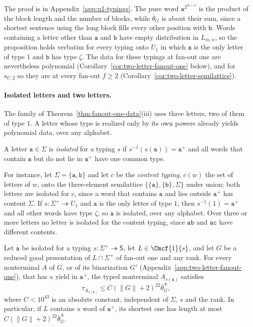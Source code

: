 The proof is in Appendix~\ref{app:u1-typings}.  The pure word
$\mathtt a^{2^{m+n}}$ is the product of the block length and the number of
blocks, while $\bar\theta_G$ is about their sum, since a shortest sentence using
the long block fills every other position with $\mathtt b$.  Words containing a
letter other than $\mathtt a$ and $\mathtt b$ have empty distribution in
$L_{m,n}$, so the proposition holds verbatim for every typing onto $U_1$ in
which $\mathtt a$ is the only letter of type $1$ and $\mathtt b$ has type $\zeta$.
The data for these typings at fan-out one are nevertheless polynomial
(Corollary~\ref{cor:two-letter-fanout-one} below), and for $s_{U,2}$ so they are
at every fan-out $f\ge2$ (Corollary~\ref{cor:two-letter-semilattice}).

\paragraph{Isolated letters and two letters.}
The family of Theorem~\ref{thm:fanout-one-data}(iii) uses three letters, two of
them of type $1$.  A letter whose type is realized only by its own powers
already yields polynomial data, over any alphabet.

\begin{definition}
\label{def:isolated-letter}
A letter $\mathtt a\in\Sigma$ is \emph{isolated} for a typing $s$ if
$s^{-1}(s(\mathtt a))=\mathtt a^+$ and all words that contain $\mathtt a$ but do
not lie in $\mathtt a^+$ have one common type.
\end{definition}

For instance, let $\Sigma=\{\mathtt a,\mathtt b\}$ and let $c$ be the
\emph{content typing}, $c(w)$ the set of letters of $w$, onto the
three-element semilattice $\{\{\mathtt a\},\{\mathtt b\},\Sigma\}$ under union;
both letters are isolated for $c$, since a word that contains $\mathtt a$ and
lies outside $\mathtt a^+$ has content $\Sigma$.  If $s:\Sigma^+\twoheadrightarrow
U_1$ and $\mathtt a$ is the only letter of type $1$, then $s^{-1}(1)=\mathtt a^+$
and all other words have type $\zeta$, so $\mathtt a$ is isolated, over any
alphabet.  Over three or more letters no letter is isolated for the content
typing, since $\mathtt{ab}$ and $\mathtt{ac}$ have different contents.

\begin{theorem}
\label{thm:two-letter-fanout-one}
Let $\mathtt a$ be isolated for a typing $s:\Sigma^+\twoheadrightarrow\mathsf S$,
let $L\in\Cmcf{1}{s}$, and let $G$ be a reduced good presentation of
$L\cap\Sigma^+$ of fan-out one and any rank.  For every nonterminal $A$ of $G$,
or of its binarization $G'$ \textup(Appendix~\ref{app:two-letter-fanout-one}\textup),
that has a yield in $\mathtt a^+$, the typed nonterminal $A_{s(\mathtt a)}$
satisfies
\[
 \tau_{A_{s(\mathtt a)}}\le C(\|G\|+2)^{22}\bar\theta_G^{\,8},
\]
where $C<10^{43}$ is an absolute constant, independent of $\Sigma$, $s$ and the
rank.  In particular, if $L$ contains a word of $\mathtt a^+$, its shortest one
has length at most $C(\|G\|+2)^{22}\bar\theta_G^{\,8}$.
\end{theorem}

